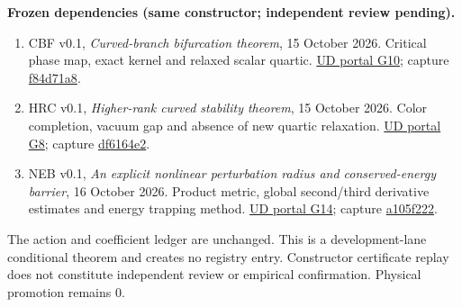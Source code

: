 \documentclass[11pt,a4paper]{article}
\begin{document}
\textbf{Frozen dependencies (same constructor; independent review pending).}
\begin{enumerate}
\item CBF v0.1, \emph{Curved-branch bifurcation theorem}, 15 October 2026. Critical phase map, exact kernel and relaxed scalar quartic. \href{https://unified-dynamics-public.ben-w-mayes.chatgpt.site/papers/\#critical-bifurcation-v01}{UD portal G10}; capture \href{https://github.com/ud-tetra/UD/tree/main/captures/2026-10-15T153746Z-codex-critical-bifurcation-f84d71a8}{f84d71a8}.
\item HRC v0.1, \emph{Higher-rank curved stability theorem}, 15 October 2026. Color completion, vacuum gap and absence of new quartic relaxation. \href{https://unified-dynamics-public.ben-w-mayes.chatgpt.site/papers/\#higher-rank-curved-v01}{UD portal G8}; capture \href{https://github.com/ud-tetra/UD/tree/main/captures/2026-10-15T135143Z-codex-higher-rank-df6164e2}{df6164e2}.
\item NEB v0.1, \emph{An explicit nonlinear perturbation radius and conserved-energy barrier}, 16 October 2026. Product metric, global second/third derivative estimates and energy trapping method. \href{https://unified-dynamics-public.ben-w-mayes.chatgpt.site/papers/\#energy-barrier-v01}{UD portal G14}; capture \href{https://github.com/ud-tetra/UD/tree/main/captures/2026-10-16T025702Z-codex-energy-barrier-a105f222}{a105f222}.
\end{enumerate}
The action and coefficient ledger are unchanged. This is a development-lane conditional theorem and creates no registry entry. Constructor certificate replay does not constitute independent review or empirical confirmation. Physical promotion remains $0$.
\end{document}
